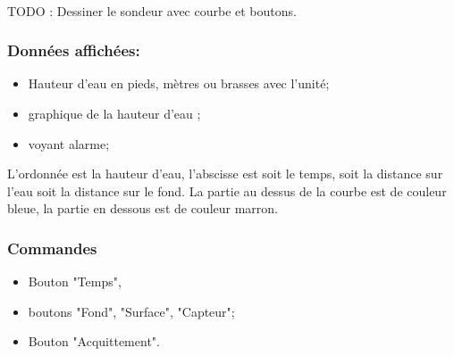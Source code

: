 \documentclass[a4paper,11pt]{report}
\begin{document}
\paragraph{}
TODO  : Dessiner le sondeur avec courbe et boutons.
\paragraph{}



\subsubsection{Données affichées:}
\begin{itemize}
	\item Hauteur d'eau en pieds, mètres ou brasses avec l'unité; 
	\item graphique de la hauteur d'eau ;
	\item voyant alarme;
\end{itemize}
L'ordonnée est la hauteur d'eau, l'abscisse est soit le temps, soit la distance sur l'eau
soit la distance sur le fond. La partie au dessus de la courbe est de couleur bleue,
la partie en dessous est de couleur marron.

\subsubsection{Commandes}
\begin{itemize}
	\item Bouton "Temps",
    \item boutons "Fond", "Surface", "Capteur";
	\item Bouton "Acquittement".
\end{itemize}
\end{document}
